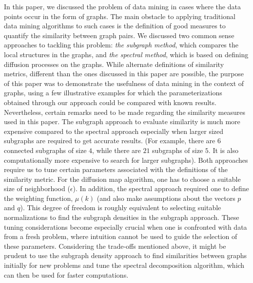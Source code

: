 In this paper, we discussed the problem of data mining in cases where
the data points occur in the form of graphs.
% 
The main obstacle to applying traditional data mining algorithms to
such cases is the definition of good measures to quantify the
similarity between graph pairs.
% 
We discussed two common sense approaches to tackling this problem:
{\em the subgraph method}, which compares the local structures in the
graphs, and {\em the spectral method}, which is based on defining
diffusion processes on the graphs.
% 
While alternate definitions of similarity metrics, different than the
ones discussed in this paper are possible, the purpose of this paper
was to demonstrate the usefulness of data mining in the context of
graphs, using a few illustrative examples for which the
parameterizations obtained through our approach could be compared with
known results.
% 
Nevertheless, certain remarks need to be made regarding the similarity
measures used in this paper.
% 
The subgraph approach to evaluate similarity is much more expensive
compared to the spectral approach especially when larger sized
subgraphs are required to get accurate results.
% 
(For example, there are $6$ connected subgraphs of size $4$, while
there are $21$ subgraphs of size $5$. It is also computationally more
expensive to search for larger subgraphs).
% 
Both approaches require us to tune certain parameters associated with
the definitions of the similarity metric.
% 
For the diffusion map algorithm, one has to choose a suitable size of
neighborhood ($\epsilon$).
% 
In addition, the spectral approach required one to define the
weighting function, $\mu(k)$ (and also make assumptions about the
vectors $p$ and $q$).
% 
This degree of freedom is roughly equivalent to selecting suitable
normalizations to find the subgraph densities in the subgraph
approach.
% 
These tuning considerations become especially crucial when one is
confronted with data from a fresh problem, where intuition cannot be
used to guide the selection of these parameters.
% 
Considering the trade-offs mentioned above, it might be prudent to use
the subgraph density approach to find similarities between graphs
initially for new problems and tune the spectral decomposition
algorithm, which can then be used for faster computations.
% 

